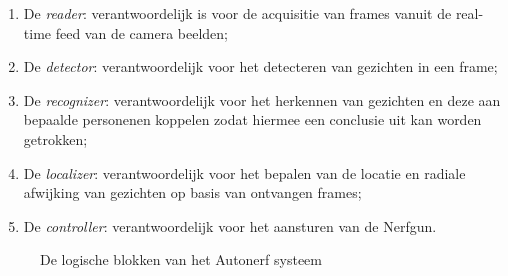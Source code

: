 \begin{enumerate}
    \item De \emph{reader}: verantwoordelijk is voor de acquisitie van
        frames vanuit de real-time feed van de camera beelden;
    \item De \emph{detector}: verantwoordelijk voor het detecteren van gezichten
        in een frame;
    \item De \emph{recognizer}: verantwoordelijk voor het herkennen van gezichten
        en deze aan bepaalde personenen koppelen zodat hiermee een conclusie
        uit kan worden getrokken;
    \item De \emph{localizer}: verantwoordelijk voor het bepalen van de locatie
        en radiale afwijking van gezichten op basis van ontvangen frames;
    \item De \emph{controller}: verantwoordelijk voor het aansturen van de
        Nerfgun.
\end{enumerate}

\begin{figure}[H]
    \begin{center}
        
    \end{center}
    \caption{De logische blokken van het Autonerf systeem}
    \label{fig:func-architecture}
\end{figure}
